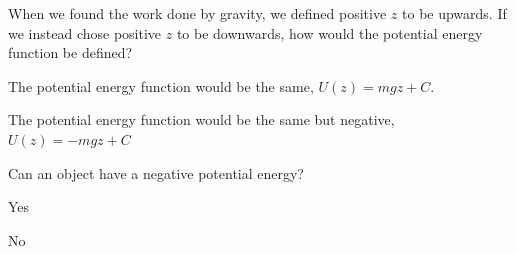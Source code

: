 \begin{checkpoint}
\begin{MCquestion}{When we found the work done by gravity, we defined positive $z$ to be upwards. If we instead chose positive $z$ to be downwards, how would the potential energy function be defined?}
\item The potential energy function would be the same, $U(z)=mgz+C$.
\item The potential energy function would be the same but negative, $U(z)=-mgz+C$ \correct
\end{MCquestion}

\end{checkpoint}
\begin{checkpoint}
\begin{MCquestion}{Can an object have a negative potential energy?}
\item Yes \correct %
\item No
\end{MCquestion}
\end{checkpoint}
\newpage
